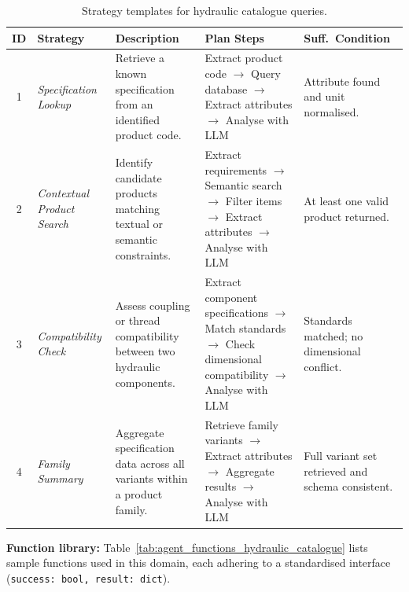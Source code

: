 \documentclass[largeformat]{interact}
\begin{document}
\begin{table}[!htbp]
\captionsetup{width=0.92\linewidth, skip=2pt}
    \caption{Strategy templates for hydraulic catalogue queries.}
    \label{tab:strategy_templates}
    \centering
    \small
    \setlength{\tabcolsep}{6pt}
    \renewcommand{\arraystretch}{1}
    \begin{tabularx}{\textwidth}{c p{1.9cm} X p{4.5cm} p{2.8cm}}
    \toprule
    \textbf{ID} &
    \textbf{Strategy} &
    \textbf{Description} &
    \textbf{Plan Steps} &
    \textbf{Suff.\ Condition} \\
    \midrule
    1 & 
    \textit{Specification Lookup} &
    Retrieve a known specification from an identified product code. &
    Extract product code $\rightarrow$ Query database $\rightarrow$ Extract attributes $\rightarrow$ Analyse with LLM &
    Attribute found and unit normalised. \\
    \midrule
    2 &
    \textit{Contextual Product Search} &
    Identify candidate products matching textual or semantic constraints. &
    Extract requirements $\rightarrow$ Semantic search $\rightarrow$ Filter items $\rightarrow$ Extract attributes $\rightarrow$ Analyse with LLM &
    At least one valid product returned. \\
    \midrule
    3 &
    \textit{Compatibility Check} &
    Assess coupling or thread compatibility between two hydraulic components. &
    Extract component specifications $\rightarrow$ Match standards $\rightarrow$ Check dimensional compatibility $\rightarrow$ Analyse with LLM &
    Standards matched; no dimensional conflict. \\
    \midrule
    4 &
    \textit{Family Summary} &
    Aggregate specification data across all variants within a product family. &
    Retrieve family variants $\rightarrow$ Extract attributes $\rightarrow$ Aggregate results $\rightarrow$ Analyse with LLM &
    Full variant set retrieved and schema consistent. \\
    \bottomrule
    \end{tabularx}
\end{table}

\noindent \textbf{Function library:} Table~\ref{tab:agent_functions_hydraulic_catalogue} lists sample functions used in this domain, each adhering to a standardised interface (\texttt{success:~bool, result:~dict}).
\end{document}
